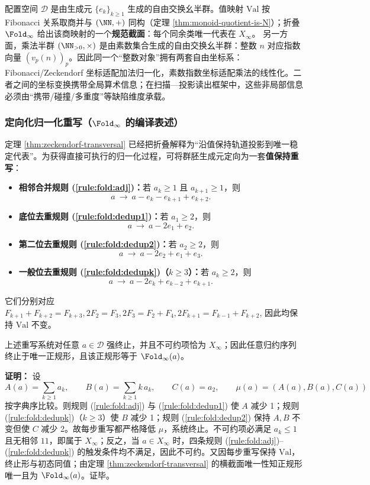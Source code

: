 \begin{remark}[两套自由交换幺半群坐标与规范截面]\label{rem:two-coordinate-monoids}
配置空间 $\mathcal{D}$ 是由生成元 $\{e_k\}_{k\ge 1}$ 生成的自由交换幺半群。值映射 $\mathrm{Val}$ 按 Fibonacci 关系取商并与 $(\NN,+)$ 同构（定理 \ref{thm:monoid-quotient-is-N}）；折叠 $\Fold_\infty$ 给出该商映射的一个\textbf{规范截面}：每个同余类唯一代表在 $X_\infty$。
另一方面，乘法半群 $(\NN_{>0},\times)$ 是由素数集合生成的自由交换幺半群：整数 $n$ 对应指数向量 $(v_p(n))_p$。因此同一个“整数对象”拥有两套自由坐标系：Fibonacci/Zeckendorf 坐标适配加法归一化，素数指数坐标适配乘法的线性化。二者之间的坐标变换携带全局算术信息；在扫描—投影读出框架中，这些非局部信息必须由“携带/碰撞/多重度”等缺陷维度承载。
\end{remark}

\subsubsection{定向化归一化重写（\texorpdfstring{$\Fold_\infty$}{Fold\_infty} 的编译表述）}\label{subsec:directed-rewrite}
定理 \ref{thm:zeckendorf-transversal} 已经把折叠解释为“沿值保持轨道投影到唯一稳定代表”。为获得直接可执行的归一化过程，可将群胚生成元定向为一套\textbf{值保持重写}：
\begin{itemize}
  \item \textbf{相邻合并规则 (\ref{rule:fold:adj})：}若 $a_k\ge 1$ 且 $a_{k+1}\ge 1$，则
  \[
  a\ \to\ a-e_k-e_{k+1}+e_{k+2}.
  \]
  \item \textbf{底位去重规则 (\ref{rule:fold:dedup1})：}若 $a_1\ge 2$，则
  \[
  a\ \to\ a-2e_1+e_2.
  \]
  \item \textbf{第二位去重规则 (\ref{rule:fold:dedup2})：}若 $a_2\ge 2$，则
  \[
  a\ \to\ a-2e_2+e_1+e_3.
  \]
  \item \textbf{一般位去重规则 (\ref{rule:fold:dedupk})（$k\ge 3$）：}若 $a_k\ge 2$，则
  \[
  a\ \to\ a-2e_k+e_{k-2}+e_{k+1}.
  \]
\end{itemize}
它们分别对应
\(
F_{k+1}+F_{k+2}=F_{k+3},
2F_2=F_3,
2F_3=F_2+F_4,
2F_{k+1}=F_{k-1}+F_{k+2}
\),
因此均保持 $\mathrm{Val}$ 不变。

\begin{proposition}[终止性与唯一正规形]\label{prop:directed-rewrite-termination}
上述重写系统对任意 $a\in\mathcal{D}$ 强终止，并且不可约项恰为 $X_\infty$；因此任意归约序列终止于唯一正规形，且该正规形等于 $\Fold_\infty(a)$。
\end{proposition}

\textbf{证明：}
设
\[
A(a)=\sum_{k\ge 1} a_k,\qquad
B(a)=\sum_{k\ge 1} k\,a_k,\qquad
C(a)=a_2,
\qquad
\mu(a)=(A(a),B(a),C(a))
\]
按字典序比较。则规则 (\ref{rule:fold:adj}) 与 (\ref{rule:fold:dedup1}) 使 $A$ 减少 1；规则 (\ref{rule:fold:dedupk})（$k\ge 3$）使 $B$ 减少 1；规则 (\ref{rule:fold:dedup2}) 保持 $A,B$ 不变但使 $C$ 减少 2。故每步重写都严格降低 $\mu$，系统终止。不可约项必满足 $a_k\le 1$ 且无相邻 $11$，即属于 $X_\infty$；反之，当 $a\in X_\infty$ 时，四条规则 (\ref{rule:fold:adj})--(\ref{rule:fold:dedupk}) 的触发条件均不满足，因此不可约。又因每步重写保持 $\mathrm{Val}$，终止形与初态同值；由定理 \ref{thm:zeckendorf-transversal} 的横截面唯一性知正规形唯一且为 $\Fold_\infty(a)$。证毕。

